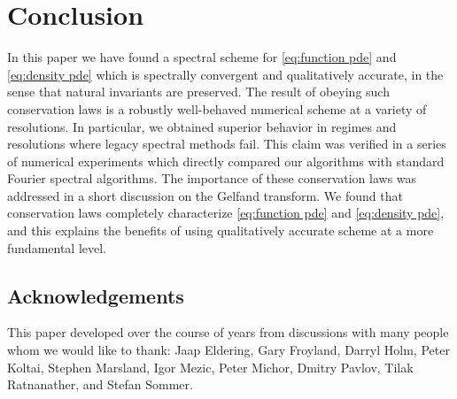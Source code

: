 \documentclass[final,leqno]{siamltex1213}
\begin{document}
\section{Conclusion}

In this paper we have found a spectral scheme for \eqref{eq:function pde} and \eqref{eq:density pde} which is spectrally convergent
and qualitatively accurate, in the sense that natural invariants are preserved.
The result of obeying such conservation laws is a robustly well-behaved numerical scheme at a variety of resolutions.
In particular, we obtained superior behavior in regimes and resolutions where legacy spectral methods fail.
This claim was verified in a series of numerical experiments which directly compared our algorithms with standard Fourier spectral algorithms.
The importance of these conservation laws was addressed in a short discussion on the Gelfand transform.
We found that conservation laws completely characterize \eqref{eq:function pde} and \eqref{eq:density pde}, and this explains the benefits of using qualitatively accurate scheme at a more fundamental level.


\subsection{Acknowledgements}
This paper developed over the course of years from discussions with many people whom we would like to thank: Jaap Eldering, Gary Froyland,
 	Darryl Holm, Peter Koltai, Stephen Marsland, Igor Mezic, Peter Michor, Dmitry Pavlov, Tilak Ratnanather, and Stefan Sommer.
\end{document}
